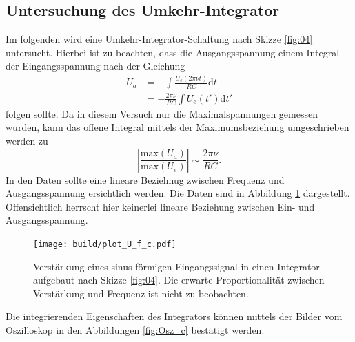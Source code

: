 \subsection{Untersuchung des Umkehr-Integrator}
Im folgenden wird eine Umkehr-Integrator-Schaltung nach Skizze \ref{fig:04} untersucht. Hierbei ist zu beachten, dass die Ausgangsspannung einem Integral der Eingangsspannung nach der Gleichung
\begin{align}
  U_a &= -\int \frac{U_e(2\pi \nu t)}{RC}\text{d}t\\
      &= -\frac{2\pi\nu}{RC} \int U_e(t') \text{d}t'
\end{align}
folgen sollte. Da in diesem Versuch nur die Maximalspannungen gemessen wurden, kann das offene Integral mittels der Maximumsbeziehung umgeschrieben werden zu
\begin{equation}
  \left|\frac{\text{max}\left(U_a\right)}{\text{max}\left(U_e\right)}\right| \sim \frac{2\pi\nu}{RC}.
\end{equation}
In den Daten sollte eine lineare Beziehnug zwischen Frequenz und Ausgangsspannung ersichtlich werden. Die Daten sind in Abbildung \ref{fig:Plot_c} dargestellt. Offensichtlich herrscht hier keinerlei lineare Beziehung zwischen Ein- und Ausgangsspannung.

\begin{figure}
  \centering
  \texttt{[image: build/plot\_U\_f\_c.pdf]}
  \caption{Verstärkung eines sinus-förmigen Eingangssignal in einen Integrator aufgebaut nach Skizze \ref{fig:04}. Die erwarte Proportionalität zwischen Verstärkung und Frequenz ist nicht zu beobachten.}
  \label{fig:Plot_c}
\end{figure}
Die integrierenden Eigenschaften des Integrators können mittels der Bilder vom Oszilloskop in den Abbildungen \ref{fig:Osz_c} bestätigt werden.

